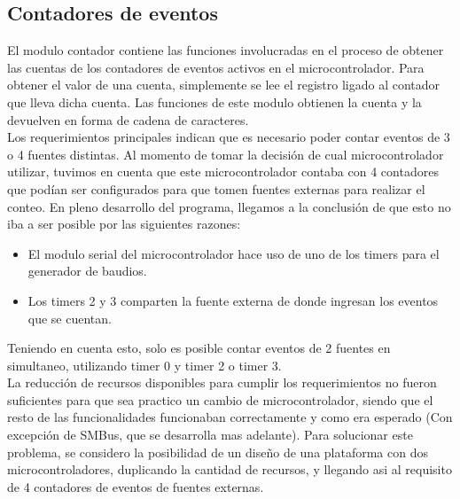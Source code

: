 

\subsection{Contadores de eventos} %
\label{it2:sub:contadores_de_eventos}


El modulo contador contiene las funciones involucradas en el proceso de obtener las cuentas de los contadores de eventos activos en el microcontrolador. Para obtener el valor de una cuenta, simplemente se lee el registro ligado al contador que lleva dicha cuenta. Las funciones de este modulo obtienen la cuenta y la devuelven en forma de cadena de caracteres. \\

Los requerimientos principales indican que es necesario poder contar eventos de 3 o 4 fuentes distintas. Al momento de tomar la decisión de cual microcontrolador utilizar, tuvimos en cuenta que este microcontrolador contaba con 4 contadores que podían ser configurados para que tomen fuentes externas para realizar el conteo. En pleno desarrollo del programa, llegamos a la conclusión de que esto no iba a ser posible por las siguientes razones:

\begin{itemize}
  \item El modulo serial del microcontrolador hace uso de uno de los timers para el generador de baudios.
  \item Los timers 2 y 3 comparten la fuente externa de donde ingresan los eventos que se cuentan.
\end{itemize}

Teniendo en cuenta esto, solo es posible contar eventos de 2 fuentes en simultaneo, utilizando timer 0 y timer 2 o timer 3. \\

La reducción de recursos disponibles para cumplir los requerimientos no fueron suficientes para que sea practico un cambio de microcontrolador, siendo que el resto de las funcionalidades funcionaban correctamente y como era esperado (Con excepción de SMBus, que se desarrolla mas adelante). Para solucionar este problema, se considero la posibilidad de un diseño de una plataforma con dos microcontroladores, duplicando la cantidad de recursos, y llegando asi al requisito de 4 contadores de eventos de fuentes externas.

